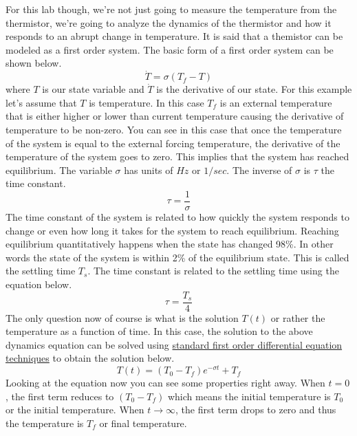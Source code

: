 For this lab though, we're not just going to measure the temperature from the thermistor, we're going to analyze the dynamics of the thermistor and how it responds to an abrupt change in temperature. It is said that a themistor can be modeled as a first order system. The basic form of a first order system can be shown below.
\begin{equation}
\dot{T} = \sigma (T_f - T)
\end{equation}
where $T$ is our state variable and $\dot{T}$ is the derivative of our state. For this example let's assume that $T$ is temperature. In this case $T_f$ is an external temperature that is either higher or lower than current temperature causing the derivative of temperature to be non-zero. You can see in this case that once the temperature of the system is equal to the external forcing temperature, the derivative of the temperature of the system goes to zero. This implies that the system has reached equilibrium. The variable $\sigma$ has units of $Hz$ or $1/sec$. The inverse of $\sigma$ is $\tau$ the time constant.
\begin{equation}
\tau = \frac{1}{\sigma}
\end{equation}
The time constant of the system is related to how quickly the system responds to change or even how long it takes for the system to reach equilibrium. Reaching equilibrium quantitatively happens when the state has changed 98\%. In other words the state of the system is within 2\% of the equilibrium state. This is called the settling time $T_s$. The time constant is related to the settling time using the equation below.
\begin{equation}
\tau = \frac{T_s}{4}
\end{equation}
The only question now of course is what is the solution $T(t)$ or rather the temperature as a function of time. In this case, the solution to the above dynamics equation can be solved using \href{https://www.youtube.com/watch?v=VOv2HI3i7oo}{standard first order differential equation techniques} to obtain the solution below.
\begin{equation}\label{e:thermistor}
T(t) = (T_0-T_f)e^{-\sigma t} + T_f
\end{equation}
Looking at the equation now you can see some properties right away. When $t=0$, the first term reduces to $(T_0-T_f)$ which means the initial temperature is $T_0$ or the initial temperature. When $t\rightarrow\infty$, the first term drops to zero and thus the temperature is $T_f$ or final temperature.

